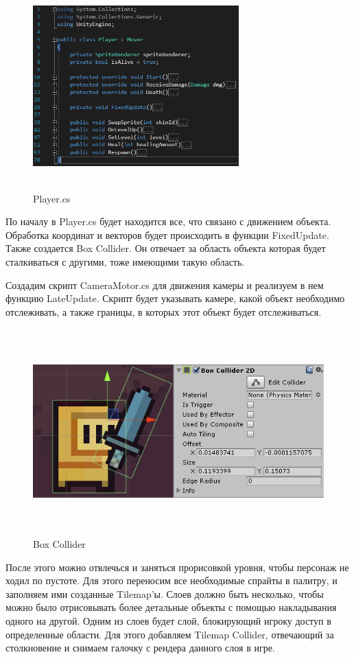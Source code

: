 \documentclass[a4paper,12pt]{article}
\begin{document}
\begin{figure}[h]
\centering
\includegraphics[width = 300px, height=300px]{pictures/player1.png}
\caption{Player.cs}
\end{figure}

По началу в Player.cs будет находится все, что связано с движением объекта. Обработка координат и векторов будет происходить в функции FixedUpdate. Также создается Box Collider. Он отвечает за область объекта которая будет сталкиваться с другими, тоже имеющими такую область.

Создадим скрипт CameraMotor.cs для движения камеры и реализуем в нем функцию LateUpdate. Скрипт будет указывать камере, какой объект необходимо отслеживать, а также границы, в которых этот объект будет отслеживаться.

\begin{figure}[h]
\centering
\includegraphics[width = 450px, height=300px]{pictures/boxcoll.png}
\caption{Box Collider}
\end{figure}

После этого можно отвлечься и заняться прорисовкой уровня, чтобы персонаж не ходил по пустоте. Для этого переносим все необходимые спрайты в палитру, и заполняем ими созданные Tilemap'ы. Слоев должно быть несколько, чтобы можно было отрисовывать более детальные объекты с помощью накладывания одного на другой. Одним из слоев будет слой, блокирующий игроку доступ в определенные области. Для этого добавляем Tilemap Collider, отвечающий за столкновение и снимаем галочку с рендера данного слоя в игре.
\end{document}
